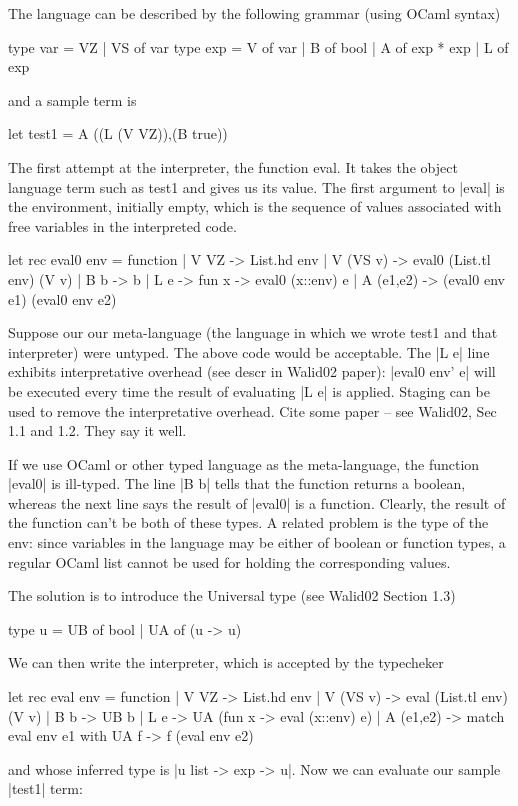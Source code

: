 \documentclass[preprint]{sigplanconf}
\begin{document}
The language can be described by the following grammar (using OCaml
syntax)


\begin{code}
  type var = VZ | VS of var
  type exp = V of var | B of bool | A of exp * exp | L of exp
\end{code}

and a sample term is
\begin{code}
  let test1 = A ((L (V VZ)),(B true))
\end{code}

The first attempt at the interpreter, the function eval. It takes the
object language term such as test1 and gives us its value.
The first argument to |eval| is the environment, initially empty,
which is the sequence of values associated with free variables in the
interpreted code.
\begin{code}
  let rec eval0 env = function 
  | V VZ -> List.hd env
  | V (VS v) -> eval0 (List.tl env) (V v)
  | B b -> b 
  | L e -> fun x -> eval0 (x::env) e
  | A (e1,e2) -> (eval0 env e1) (eval0 env e2) 
\end{code}

Suppose our our meta-language (the language in which we wrote test1
and that interpreter) were untyped. The above code would be acceptable.
The |L e| line exhibits interpretative overhead (see descr in Walid02
paper): |eval0 env' e| will be executed every time the result of
evaluating |L e| is applied. Staging can be used to remove the
interpretative overhead. Cite some paper -- see Walid02, Sec 1.1 and
1.2. They say it well.

If we use OCaml or other typed language as the meta-language, 
the function |eval0| is ill-typed. The line |B b|
tells that the function returns a boolean, whereas the next line says
the result of |eval0| is a function. Clearly, the result of the
function can't be both of these types. 
A related problem is the type of the env: since variables
in the language may be either of boolean or function types, a regular
OCaml list cannot be used for holding the corresponding values. 

The solution is to introduce the Universal type (see Walid02 Section
1.3)

\begin{code}
  type u = UB of bool | UA of (u -> u)
\end{code}

We can then write the interpreter, which is accepted by the typecheker
\begin{code}
  let rec eval env = function
  | V VZ -> List.hd env
  | V (VS v) -> eval (List.tl env) (V v)
  | B b -> UB b
  | L e -> UA (fun x -> eval (x::env) e)
  | A (e1,e2) -> match eval env e1 with UA f -> f (eval env e2)
\end{code}
and whose inferred type is |u list -> exp -> u|. Now we can evaluate
our sample |test1| term:
\end{document}
